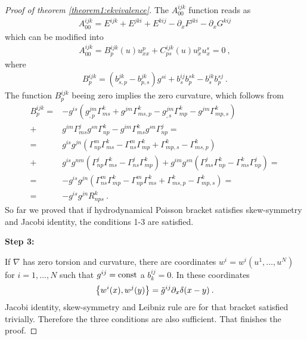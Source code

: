 \begin{proof}[Proof of theorem \ref{theorem1:ekvivalence}]
    The $A^{ijk}_{00}$ function reads as
    \begin{align}
        A_{00}^{ijk} = E^{ijk} + E^{jki} + E^{kij} - \partial_x F^{jki} - \partial_x G^{kij}
    \end{align}
    which can be modified into
    \begin{align}
        A_{00}^{ijk} = B^{ijk}_p(u) u^p_{xx} + C^{ijk}_{ps}(u) u^p_x u^s_x = 0 \:,
    \end{align}
    where
    \begin{align}
        B^{ijk}_p 
        = (b^{jk}_{s,p} - b^{jk}_{p,s}) g^{si} + b_s^{ij} b_p^{sk} - b_s^{ik} b_p^{sj} \:.
    \end{align}
    The function $B^{ijk}_p$ beeing zero implies the zero curvature, which follows from
    \begin{align*}
        B^{ijk}_p  
        =& -g^{is} \left( g^{jm}_{,p} \Gamma^k_{ms} + g^{jm} \Gamma^k_{ms,p} - g^{jm}_{,s} \Gamma^k_{mp} - g^{jm} \Gamma^k_{mp,s} \right) 
        \\ +& g^{im} \Gamma^j_{ms} g^{sn} \Gamma^{k}_{np} - g^{im} \Gamma^k_{ms} g^{sn} \Gamma^j_{np}
        = \\ =& g^{is} g^{jn} \left( \Gamma^m_{np} \Gamma^k_{ms} - \Gamma^{m}_{ns} \Gamma^k_{mp} + \Gamma^{k}_{mp,s} -  \Gamma^{k}_{ms,p} \right) 
        \\ +& g^{is} g^{nm} \left( \Gamma^j_{np} \Gamma^{k}_{ms} - \Gamma^j_{ns} \Gamma^k_{mp} \right) + g^{im} g^{sn} \left( \Gamma^j_{ms} \Gamma^k_{np} - \Gamma^k_{ms} \Gamma^j_{np} \right)
        = \\ =& -g^{is} g^{jn} \left( \Gamma^{m}_{ns} \Gamma^k_{mp}  - \Gamma^m_{np} \Gamma^k_{ms} + \Gamma^{k}_{ms,p} - \Gamma^{k}_{mp,s} \right)
        = \\ =& -g^{is} g^{jn} R^k_{nps} \:.
    \end{align*}
    So far we proved that if hydrodynamical Poisson bracket satisfies skew-symmetry and Jacobi identity, the conditions 1-3 are satisfied.

    \textbf{Step 3:}

    If $\nabla$ has zero torsion and curvature, there are coordinates $w^i=w^i(u^1,\dots,u^N)$ for $i=1,\dots,N$ such that $g^{ij} = \mathrm{const}$ a $b^{ij}_k = 0$. In these coordinates
    \begin{align}
        \left \lbrace w^i(x),w^j(y) \right \rbrace = \tilde{g}^{ij} \partial_x \delta(x-y) \:.
    \end{align}
    Jacobi identity, skew-symmetry and Leibniz rule are for that bracket satisfied trivially. Therefore the three conditions are also sufficient. That finishes the proof.
\end{proof}

